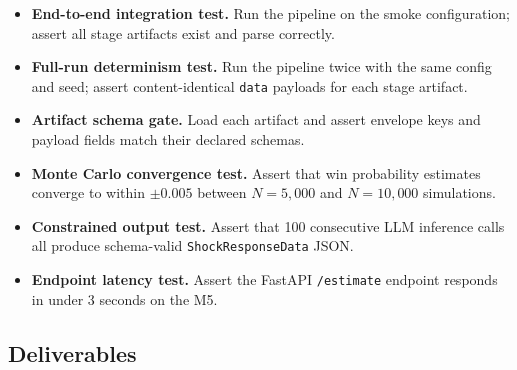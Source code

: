 \documentclass[11pt]{article}
\begin{document}
\begin{itemize}[leftmargin=1.6em, itemsep=3pt]
  \item \textbf{End-to-end integration test.} Run the pipeline on the smoke configuration;
        assert all stage artifacts exist and parse correctly.
  \item \textbf{Full-run determinism test.} Run the pipeline twice with the same config and seed;
        assert content-identical \texttt{data} payloads for each stage artifact.
  \item \textbf{Artifact schema gate.} Load each artifact and assert envelope keys and
        payload fields match their declared schemas.
  \item \textbf{Monte Carlo convergence test.} Assert that win probability estimates
        converge to within $\pm 0.005$ between $N = 5{,}000$ and $N = 10{,}000$ simulations.
  \item \textbf{Constrained output test.} Assert that 100 consecutive LLM inference calls
        all produce schema-valid \texttt{ShockResponseData} JSON.
  \item \textbf{Endpoint latency test.} Assert the FastAPI \texttt{/estimate} endpoint
        responds in under 3 seconds on the M5.
\end{itemize}

\subsection*{Deliverables}
\end{document}
